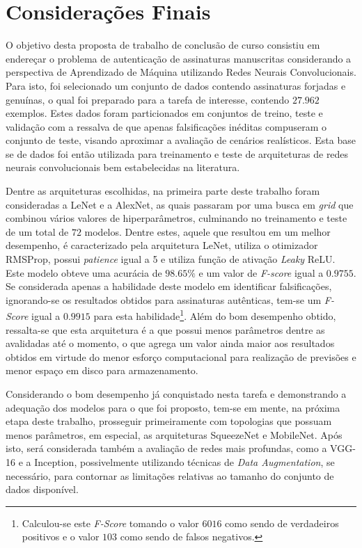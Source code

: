 
\chapter{Considerações Finais} \label{cap:consideracoes}

O objetivo desta proposta de trabalho de conclusão de curso consistiu em endereçar o problema de autenticação de assinaturas manuscritas considerando a perspectiva de Aprendizado de Máquina utilizando Redes Neurais Convolucionais. Para isto, foi selecionado um conjunto de dados contendo assinaturas forjadas e genuínas, o qual foi preparado para a tarefa de interesse, contendo $27.962$ exemplos. Estes dados foram particionados em conjuntos de treino, teste e validação com a ressalva de que apenas falsificações inéditas compuseram o conjunto de teste, visando aproximar a avaliação de cenários realísticos. Esta base se de dados foi então utilizada para treinamento e teste de arquiteturas de redes neurais convolucionais bem estabelecidas na literatura.

Dentre as arquiteturas escolhidas, na primeira parte deste trabalho foram consideradas a LeNet e a AlexNet, as quais passaram por uma busca em \emph{grid} que combinou vários valores de hiperparâmetros, culminando no treinamento e teste de um total de $72$ modelos. Dentre estes, aquele que resultou em um melhor desempenho, é caracterizado pela arquitetura LeNet, utiliza o otimizador RMSProp, possui \emph{patience} igual a 5 e utiliza função de ativação \emph{Leaky} ReLU. Este modelo obteve uma acurácia de $98.65\%$ e um valor de \emph{F-score} igual a $0.9755$. Se considerada apenas a habilidade deste modelo em identificar falsificações, ignorando-se os resultados obtidos para assinaturas autênticas, tem-se um \emph{F-Score} igual a $0.9915$ para esta habilidade\footnote{Calculou-se este \emph{F-Score} tomando o valor $6016$ como sendo de verdadeiros positivos e o valor $103$ como sendo de falsos negativos.}. Além do bom desempenho obtido, ressalta-se que esta arquitetura é a que possui menos parâmetros dentre as avalidadas até o momento, o que agrega um valor ainda maior aos resultados obtidos em virtude do menor esforço computacional para realização de previsões e menor espaço em disco para armazenamento. 

Considerando o bom desempenho já conquistado nesta tarefa e demonstrando a adequação dos modelos para o que foi proposto, tem-se em mente, na próxima etapa deste trabalho, prosseguir primeiramente com topologias que possuam menos parâmetros, em especial, as arquiteturas SqueezeNet e MobileNet. Após isto, será considerada também a avaliação de redes mais profundas, como a VGG-16 e a Inception, possivelmente utilizando técnicas de \emph{Data Augmentation}, se necessário, para contornar as limitações relativas ao tamanho do conjunto de dados disponível.

